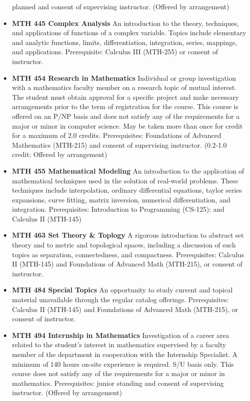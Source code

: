 \documentclass[
  letterpaper,
]{scrbook}
\begin{document}
\begin{itemize}
  planned and consent of supervising instructor. (Offered by
  arrangement)
\item
  \textbf{MTH 445 Complex Analysis} An introduction to the theory,
  techniques, and applications of functions of a complex variable.
  Topics include elementary and analytic functions, limits,
  differentiation, integration, series, mappings, and applications.
  Prerequisite: Calculus III (MTH-255) or consent of instructor.
\item
  \textbf{MTH 454 Research in Mathematics} Individual or group
  investigation with a mathematics faculty member on a research topic of
  mutual interest. The student must obtain approval for a specific
  project and make necessary arrangements prior to the term of
  registration for the course. This course is offered on an P/NP basis
  and does not satisfy any of the requirements for a major or minor in
  computer science. May be taken more than once for credit for a maximum
  of 2.0 credits. Prerequisites: Foundations of Advanced Mathematics
  (MTH-215) and consent of supervising instructor. (0.2-1.0 credit;
  Offered by arrangement)
\item
  \textbf{MTH 455 Mathematical Modeling} An introduction to the
  application of mathematical techniques used in the solution of
  real-world problems. These techniques include interpolation, ordinary
  differential equations, taylor series expansions, curve fitting,
  matrix inversion, numerical differentiation, and integration.
  Prerequisites: Introduction to Programming (CS-125); and Calculus II
  (MTH-145)
\item
  \textbf{MTH 463 Set Theory \& Toplogy} A rigorous introduction to
  abstract set theory and to metric and topological spaces, including a
  discussion of such topics as separation, connectedness, and
  compactness. Prerequisites: Calculus II (MTH-145) and Foundations of
  Advanced Math (MTH-215), or consent of instructor.
\item
  \textbf{MTH 484 Special Topics} An opportunity to study current and
  topical material unavailable through the regular catalog offerings.
  Prerequisites: Calculus II (MTH-145) and Foundations of Advanced Math
  (MTH-215), or consent of instructor.
\item
  \textbf{MTH 494 Internship in Mathematics} Investigation of a career
  area related to the student's interest in mathematics supervised by a
  faculty member of the department in cooperation with the Internship
  Specialist. A minimum of 140 hours on-site experience is required. S/U
  basis only. This course does not satisfy any of the requirements for a
  major or minor in mathematics. Prerequisites: junior standing and
  consent of supervising instructor. (Offered by arrangement)
\end{itemize}
\end{document}
